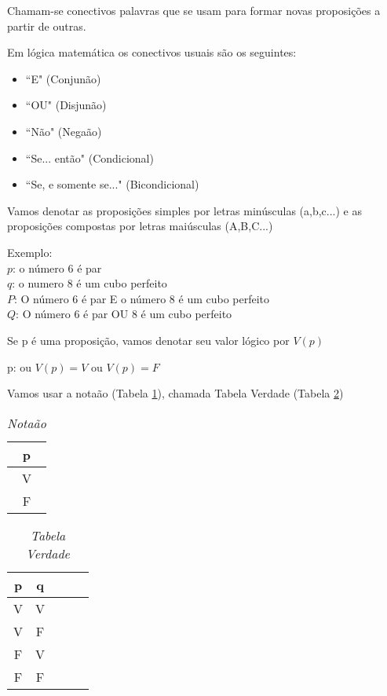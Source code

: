 \begin{definicao}[Conectivos]Chamam-se conectivos palavras que se usam para formar novas proposições a partir de outras.\end{definicao}

Em lógica matemática os conectivos usuais são os seguintes:
\begin{itemize}
\item ``E" (Conjunão)
\item ``OU" (Disjunão)
\item ``Não" (Negaão)
\item ``Se... então" (Condicional)
\item ``Se, e somente se..." (Bicondicional)
\end{itemize}

Vamos denotar as proposições simples por letras minúsculas (a,b,c...) e as proposições compostas por letras maiúsculas (A,B,C...)

Exemplo:\\
\textbf{$p$}: o número 6 é par\\
\textbf{$q$}: o numero 8 é um cubo perfeito\\
\textbf{$P$}: O número 6 é par E o número 8 é um cubo perfeito\\
\textbf{$Q$}: O número 6 é par OU 8 é um cubo perfeito

Se p é uma proposição, vamos denotar seu valor lógico por $V(p)$
\begin{center}
p: ou $V(p)=V$ ou $V(p)=F$
\end{center}

Vamos usar a notaão (Tabela \ref{notacao}), chamada Tabela Verdade (Tabela \ref{tabelavdd})
\begin{table}[h]
   \centering
   \setlength{\arrayrulewidth}{0,5\arrayrulewidth}

   \caption{\it Notaão}
   \begin{tabular}{|c|}
      \hline
      p \\
      \hline
      V \\
      \hline
      F \\
      \hline
   \end{tabular}
\label{notacao}
\end{table}


\begin{table}[h]
   \centering
   \setlength{\arrayrulewidth}{0,5\arrayrulewidth}
   \caption{\it Tabela Verdade}
   \begin{tabular}{|c|c|c|c|c|}
      \hline
      p & q \\
      \hline
      V & V \\
      \hline
      V & F\\
      \hline
      F & V \\
      \hline
      F & F \\
      \hline
   \end{tabular}
\label{tabelavdd}
\end{table}


